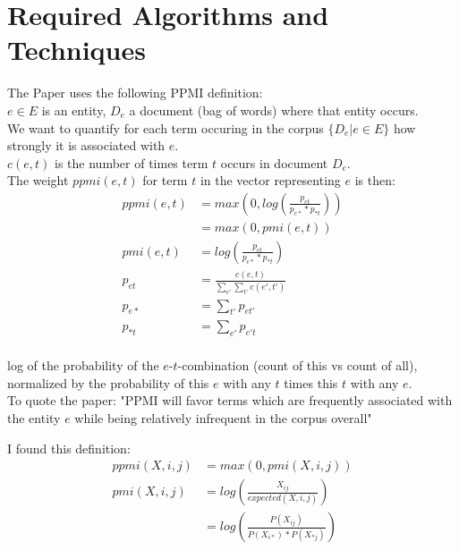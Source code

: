 \documentclass[11pt,
  paper=a4, 
  hidelinks,
  bibliography=totocnumbered,
	captions=tableheading,
	BCOR=10mm
]{scrreprt}
\theoremstyle{definition}
\begin{document}
\section{Required Algorithms and Techniques}

The Paper uses the following PPMI definition:\\ 

\noindent $e \in E$ is an entity, $D_e$ a document (bag of words) where that entity occurs.\\
We want to quantify for each term occuring in the corpus $\{D_e | e \in E\}$ how strongly it is associated with $e$.\\
$c(e,t)$ is the number of times term $t$ occurs in document $D_e$. \\
The weight $ppmi(e,t)$ for term $t$ in the vector representing $e$ is then:
\begin{align*}
ppmi(e,t) &= max\left(0, log\left( \frac{p_{et}}{p_{e*}*p_{*t}} \right) \right) \\
          &= max\left(0, pmi(e,t) \right) \\
 pmi(e,t) &= log\left( \frac{p_{et}}{p_{e*}*p_{*t}} \right) \\          
   p_{et} &= \frac{c(e,t)}{\sum_{e'}\sum_{t'} c(e',t')} \\
   p_{e*} &= \sum_{t'}p_{et'} \\
   p_{*t} &= \sum_{e'}p_{e't} \\
\end{align*}

\noindent log of the probability of the $e$-$t$-combination (count of this vs count of all), normalized by the probability of this $e$ with any $t$ times this $t$ with any $e$.\\
To quote the paper: "PPMI will favor terms which are frequently associated with the entity $e$ while being relatively infrequent in the corpus overall"

\vspace{30px}

I found this definition:
\begin{align*}
ppmi(X,i,j) &= max(0, pmi(X,i,j)) \\
pmi(X,i,j)  &= log\left( \frac{X_{ij}}{expected(X,i,j)} \right) \\
            &= log\left( \frac{P(X_{ij})}{P(X_{i*}) * P(X_{*j})} \right)
\end{align*}



\end{document}
